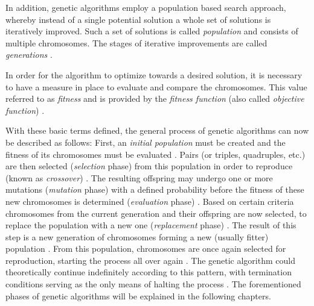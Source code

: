 \documentclass[sigconf]{acmart}
\begin{document}
In addition, genetic algorithms employ a population based search approach,
whereby instead of a single potential solution a whole set of solutions is
iteratively improved. Such a set of solutions is called \textit{population}
and consists of multiple chromosomes. The stages of iterative improvements
are called \textit{generations} \cite{Affenzeller2009}.

In order for the algorithm to optimize towards a desired solution, it is
necessary to have a measure in place to evaluate and compare the chromosomes.
This value referred to as \textit{fitness} and is provided by the
\textit{fitness function} (also called \textit{objective function})
\cite{Affenzeller2009}.

With these basic terms defined, the general process of genetic algorithms
can now be described as follows:
First, an \textit{initial population} must be created and the fitness of its
chromosomes must be evaluated \cite{Affenzeller2009}.
Pairs (or triples, quadruples, etc.) are then selected
(\textit{selection} phase) from this population in order to reproduce
(known as \textit{crossover}) \cite{Affenzeller2009}.
The resulting offspring may undergo one or more mutations
(\textit{mutation} phase) with a defined probability before the fitness of
these new chromosomes is determined (\textit{evaluation} phase)
\cite{Affenzeller2009}.
Based on certain criteria chromosomes from the current generation and their
offspring are now selected, to replace the population with a new one
(\textit{replacement} phase) \cite{Affenzeller2009}.
The result of this step is a new generation of chromosomes forming a new
(usually fitter) population \cite{Affenzeller2009}.
From this population, chromosomes are once again selected for reproduction,
starting the process all over again \cite{Affenzeller2009}.
The genetic algorithm could theoretically continue indefinitely according to
this pattern, with termination conditions serving as the only means of halting
the process \cite{Beligiannis2009}.
%
The forementioned phases of genetic algorithms will be explained in the
following chapters.

\end{document}
